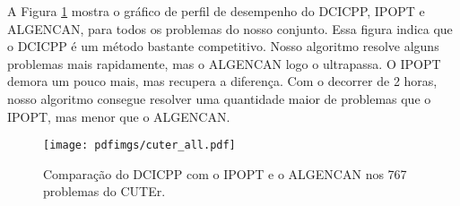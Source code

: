 A Figura \ref{fig:cuter_strict} mostra o gráfico de perfil de desempenho
do DCICPP, IPOPT e ALGENCAN, para todos os problemas do nosso conjunto.
Essa figura indica que o DCICPP é um método bastante competitivo.
Nosso algoritmo resolve alguns problemas mais rapidamente,
mas o ALGENCAN logo o ultrapassa. O IPOPT demora um pouco mais, mas recupera a
diferença. 
Com o decorrer de 2 horas, nosso algoritmo consegue resolver uma quantidade
maior de problemas que o IPOPT, mas menor que o ALGENCAN.

\begin{figure}[!ht]
\centering
\texttt{[image: pdfimgs/cuter\_all.pdf]}
\caption{ Comparação do DCICPP com o IPOPT e o ALGENCAN nos 767 problemas 
do CUTEr. }
\label{fig:cuter_strict}
\end{figure}


